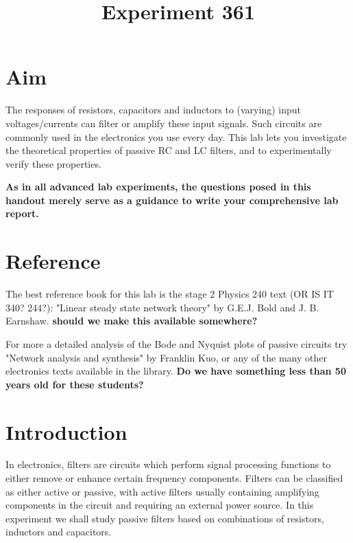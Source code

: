 \documentclass{article}
\begin{document}
\title{Experiment 361}
\author{ }
\maketitle

\section*{Aim}
The responses of resistors, capacitors and inductors to (varying)
input voltages/currents can filter or amplify these input
signals. Such circuits are commonly used in the electronics you use
every day. This lab lets you investigate the theoretical properties of
passive RC and LC filters, and to experimentally verify these
properties.

{\bf As in all advanced lab experiments, the questions posed in this
handout merely serve as a guidance to write your comprehensive lab
report.}

\section*{Reference}
The best reference book for this lab is the stage 2 Physics 240 text
(OR IS IT 340? 244?): "Linear steady state network theory" by
G.E.J. Bold and J. B. Earnshaw. {\bf should we make this available
  somewhere?}

For more a detailed analysis of the Bode and Nyquist plots of passive
circuits try "Network analysis and synthesis" by Franklin Kuo, or any
of the many other electronics texts available in the library. {\bf Do
  we have something less than 50 years old for these students?}
 
\section*{Introduction}
In electronics, filters are circuits which perform signal processing
functions to either remove or enhance certain frequency
components. Filters can be classified as either active or passive,
with active filters usually containing amplifying components in the
circuit and requiring an external power source. In this experiment we
shall study passive filters based on combinations of resistors,
inductors and capacitors. 
\end{document}
